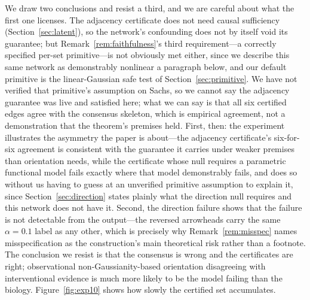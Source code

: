 We draw two conclusions and resist a third, and we are careful about what the
first one licenses. The adjacency certificate does not need causal
sufficiency (Section~\ref{sec:latent}), so the network's confounding does not
by itself void its guarantee; but Remark~\ref{rem:faithfulness}'s third
requirement---a correctly specified per-set primitive---is not obviously met
either, since we describe this same network as demonstrably nonlinear a
paragraph below, and our default primitive is the linear-Gaussian safe test
of Section~\ref{sec:primitive}. We have not verified that primitive's
assumption on Sachs, so we cannot say the adjacency guarantee was live and
satisfied here; what we can say is that all six certified edges agree with
the consensus skeleton, which is empirical agreement, not a demonstration
that the theorem's premises held. First, then: the experiment illustrates the
asymmetry the paper is about---the adjacency certificate's six-for-six
agreement is consistent with the guarantee it carries under weaker premises
than orientation needs, while the certificate whose null requires a
parametric functional model fails exactly where that model demonstrably
fails, and does so without us having to guess at an unverified primitive
assumption to explain it, since Section~\ref{sec:direction} states plainly
what the direction null requires and this network does not have it. Second,
the direction failure shows that the failure is not detectable from the
output---the reversed arrowheads carry the same $\alpha = 0.1$ label as any
other, which is precisely why Remark~\ref{rem:misspec} names misspecification
as the construction's main theoretical risk rather than a footnote. The
conclusion we resist is that the consensus is wrong and the certificates are
right; observational non-Gaussianity-based orientation disagreeing with
interventional evidence is much more likely to be the model failing than the
biology.
Figure~\ref{fig:exp10} shows how slowly the certified set accumulates.

